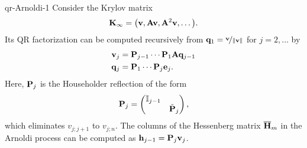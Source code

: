\begin{Lemma}{qr-Arnoldi-1}
  Consider the Krylov matrix
  \begin{gather}
    \mathbf K_\infty = \bigl(\mathbf v,\mathbf A\mathbf v,\mathbf A^2\mathbf v,\dots\bigr).
  \end{gather}
  Its QR factorization can be computed recursively from
  $\mathbf q_1 = \nicefrac{\mathbf v}{\lVert\mathbf v\rVert}$ for $j=2,\ldots$ by
  \begin{align}
    \label{eq:Arnoldi-Householder:1}
    \mathbf v_j &= \mathbf P_{j-1}\cdots \mathbf P_1\mathbf A\mathbf q_{j-1}\\
    \label{eq:Arnoldi-Householder:2}
    \mathbf q_j &= \mathbf P_1\cdots \mathbf P_j\mathbf e_j.
  \end{align}
  Here, $\mathbf P_j$ is the Householder reflection of the form
  \begin{gather}
    \label{eq:Arnoldi-Householder:3}
    \mathbf P_j =
    \begin{pmatrix}
      \mathbb I_{j-1}\\& \tilde {\mathbf P}_{j}
    \end{pmatrix},
  \end{gather}
  which eliminates $v_{j;j+1}$ to $v_{j;n}$.  The columns of the
  Hessenberg matrix $\overline{\mathbf H}_m$ in the Arnoldi process can be computed
  as $\mathbf h_{j-1} = \mathbf P_j\mathbf v_j$.
\end{Lemma}

